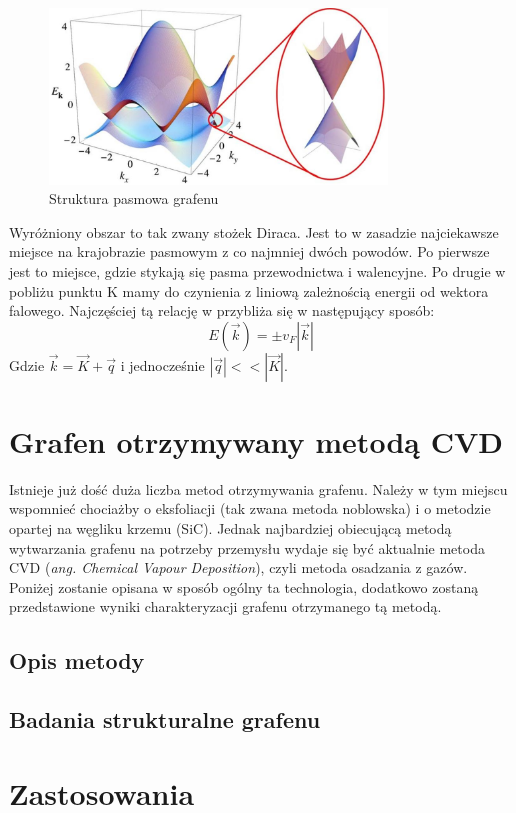 	\vspace{-10pt}
	\begin{figure}[ht]
	\centering
	\includegraphics[width=0.80\textwidth]{./Rozdzial_2/obrazki/Struktura_pasmowa.jpg}
	\caption{Struktura pasmowa grafenu}
	\label{fig:Struktura_pasmowa}
	\end{figure}
	\vspace{-10pt}

	Wyróżniony obszar to tak zwany stożek Diraca. Jest to w zasadzie najciekawsze miejsce na krajobrazie pasmowym z 
	co najmniej dwóch powodów. Po pierwsze jest to miejsce, gdzie stykają się pasma przewodnictwa i walencyjne. 
	Po drugie w pobliżu punktu K mamy do czynienia z liniową zależnością energii od wektora falowego. 
	Najczęściej tą relację w przybliża się w następujący sposób:
	\begin{equation}
    		E(\vec k) = \pm v_F|\vec k|
	\end{equation}
	Gdzie $\vec k = \vec K + \vec q$ i jednocześnie $|\vec q| << |\vec K|$.

	\section{Grafen otrzymywany metodą CVD}
	Istnieje już dość duża liczba metod otrzymywania grafenu. Należy w tym miejscu wspomnieć chociażby o eksfoliacji
(tak zwana metoda noblowska) i o metodzie opartej na węgliku krzemu (SiC). Jednak najbardziej obiecującą metodą
wytwarzania grafenu na potrzeby przemysłu wydaje się być aktualnie metoda CVD (\textit{ang. Chemical Vapour Deposition}), czyli
metoda osadzania z gazów. Poniżej zostanie opisana w sposób ogólny ta technologia, dodatkowo zostaną przedstawione wyniki 
charakteryzacji grafenu otrzymanego tą metodą.
		\subsection{Opis metody}
		\subsection{Badania strukturalne grafenu}
	\section{Zastosowania}
